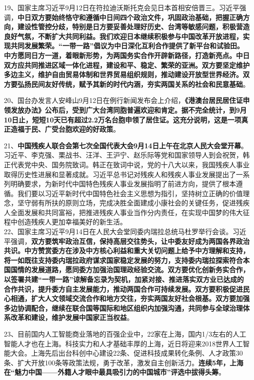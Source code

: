 19、国家主席习近平9月12日在符拉迪沃斯托克会见日本首相安倍晋三。习近平强调，{\textbf{中日双方要始终恪守和遵循中日间四个政治文件，巩固政治基础，把握正确方向，建设性管控分歧，特别是日方要妥善处理好历史、台湾等敏感问题，积极营造良好气氛，不断扩大共同利益。我们欢迎日本继续积极参与中国改革开放进程，实现共同发展繁荣。``一带一路''倡议为中日深化互利合作提供了新平台和试验田。中方愿同日方一道，着眼新形势，为两国务实合作开辟新路径，打造新亮点。中日双方应共同推进区域一体化进程，建设和平、稳定、繁荣的亚洲。双方要坚定维护多边主义，维护自由贸易体制和世界贸易组织规则，推动建设开放型世界经济。双方要弘扬民间友好传统，赋予其新的时代内涵，夯实两国关系的社会和民意基础}}。

20、国台办发言人安峰山9月12日在例行新闻发布会上介绍，{\textbf{《港澳台居民居住证申领发放办法》公布后，受到广大台湾同胞普遍欢迎和肯定。据不完全统计，到9月10日止，短短10天已有超过2.2万名台胞申领了居住证。这充分说明，这是一项真正造福于民、广受台胞欢迎的好政策}}。

21、{\textbf{中国残疾人联合会第七次全国代表大会9月14日上午在北京人民大会堂开幕}}。习近平、李克强、栗战书、汪洋、王沪宁、赵乐际等党和国家领导人到会祝贺，韩正代表党中央、国务院致词。韩正在致词中说，党的十八大以来，我国残疾人事业取得历史性进展和显著成就。习近平总书记对残疾人和残疾人事业发展提出了一系列明确要求，为新时代中国特色残疾人事业发展指明了前进方向，提供了根本遵循。我们要以习近平新时代中国特色社会主义思想为指引，坚持树立正确的价值理念，坚守弱有所扶的原则立场，完成决胜全面建成小康社会的关键任务，促进残疾人全面发展和共同富裕，把推进残疾人事业当作分内责任，在实现中国梦的伟大征程中创造残疾人更加幸福美好的新生活。\\

22、国家主席习近平9月14日在人民大会堂同委内瑞拉总统马杜罗举行会谈。习近平强调，{\textbf{双方要筑牢政治互信，保持高层交往势头，让中委友好成为两国各界政治共识。中方赞赏委方在涉及中方核心利益和重大关切问题上给予中方理解和支持，将一如既往支持委内瑞拉政府谋求国家稳定发展的努力，支持委内瑞拉探索符合本国国情的发展道路，愿同委方加强治国理政经验交流。双方要优化创新务实合作，以签署共建``一带一路''谅解备忘录为契机，加紧对接、推进落实双方业已达成的合作共识，提升委方自主发展能力，推动两国合作可持续发展。双方要积极促进民心相通，扩大人文领域交流合作和地方交往，夯实两国友好社会根基。双方要加强多边协调配合，继续在联合国等国际和地区组织内加强沟通，共同参与全球治理体系改革和建设，维护发展中国家正当权益}}。

23、目前国内人工智能商业落地的百强企业中，22家在上海，国内1/3左右的人工智能人才也在上海。科技实力和人才基础丰厚的上海，近日将迎来2018世界人工智能大会。上海先后出台科创中心建设22条、促进科技成果转化条例、人才政策30条、扩大开放100条等政策法规，勇于改革，激发自主创新活力。{\textbf{连续5年，上海在``魅力中国------外籍人才眼中最具吸引力的中国城市''评选中拔得头筹}}。

